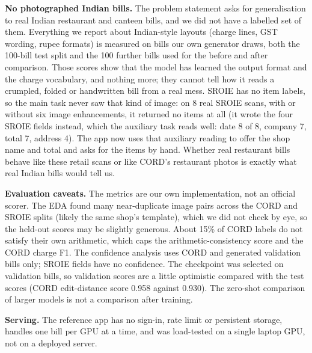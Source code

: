 \textbf{No photographed Indian bills.} The problem statement asks for generalisation to real Indian restaurant and canteen bills, and we did not have a labelled set of them. Everything we report about Indian-style layouts (charge lines, GST wording, rupee formats) is measured on bills our own generator draws, both the 100-bill test split and the 100 further bills used for the before and after comparison. Those scores show that the model has learned the output format and the charge vocabulary, and nothing more; they cannot tell how it reads a crumpled, folded or handwritten bill from a real mess. SROIE has no item labels, so the main task never saw that kind of image: on 8 real SROIE scans, with or without six image enhancements, it returned no items at all (it wrote the four SROIE fields instead, which the auxiliary task reads well: date 8 of 8, company 7, total 7, address 4). The app now uses that auxiliary reading to offer the shop name and total and asks for the items by hand. Whether real restaurant bills behave like these retail scans or like CORD's restaurant photos is exactly what real Indian bills would tell us.

\textbf{Evaluation caveats.} The metrics are our own implementation, not an official scorer. The EDA found many near-duplicate image pairs across the CORD and SROIE splits (likely the same shop's template), which we did not check by eye, so the held-out scores may be slightly generous. About 15\% of CORD labels do not satisfy their own arithmetic, which caps the arithmetic-consistency score and the CORD charge F1. The confidence analysis uses CORD and generated validation bills only; SROIE fields have no confidence. The checkpoint was selected on validation bills, so validation scores are a little optimistic compared with the test scores (CORD edit-distance score 0.958 against 0.930). The zero-shot comparison of larger models is not a comparison after training.

\textbf{Serving.} The reference app has no sign-in, rate limit or persistent storage, handles one bill per GPU at a time, and was load-tested on a single laptop GPU, not on a deployed server.

